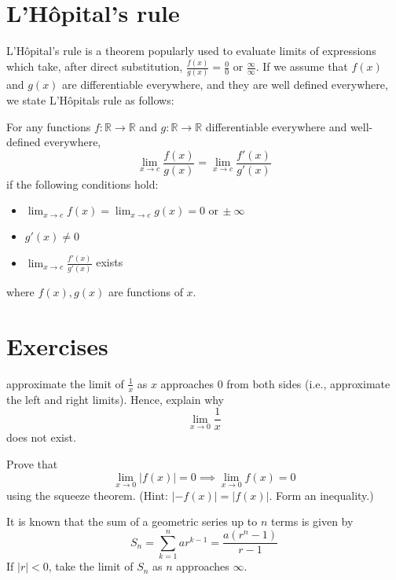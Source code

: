 \section{L'H\^{o}pital's rule}
L'H\^{o}pital's rule is a theorem popularly used to evaluate limits of expressions which take,
after direct substitution, $\frac{f(x)}{g(x)} = \frac{0}{0}$ or $\frac{\infty}{\infty}$.
If we assume that $f(x)$ and $g(x)$ are differentiable everywhere, and they are well defined
everywhere, we state L'H\^{o}pitals rule as follows:

\begin{theorem}
    For any functions $f : \mathbb{R} \to \mathbb{R}$ and $g : \mathbb{R} \to \mathbb{R}$ differentiable everywhere and well-defined
    everywhere,
    \[\lim_{x \to c} \frac{f(x)}{g(x)} = \lim_{x \to c} \frac{f'(x)}{g'(x)}\]
    if the following conditions hold:
    \begin{itemize}
        \item $\lim_{x \to c} f(x) = \lim_{x \to c} g(x) = 0 \,\,\text{or}\,\pm \infty$
        \item $g'(x) \ne 0$
        \item $\lim_{x \to c} \frac{f'(x)}{g'(x)}$ exists
    \end{itemize}
    where $f(x),g(x)$ are functions of $x$.
\end{theorem}

\newpage
\section{Exercises}

\begin{exercise}
    approximate the limit of $\frac{1}{x}$ as $x$ approaches $0$ from both sides
    (i.e., approximate the left and right limits). Hence, explain why
    \[\lim_{x \to 0} \frac{1}{x}\]
    does not exist.
\end{exercise}

\begin{exercise}
    Prove that \[\lim_{x \to 0} |f(x)| = 0 \implies \lim_{x \to 0} f(x) = 0\]
    using the squeeze theorem. (Hint: $|-f(x)| = |f(x)|$. Form an inequality.)
\end{exercise}

\begin{exercise}
    It is known that the sum of a geometric series up to $n$ terms is given by
    \[S_n = \sum_{k=1}^n ar^{k - 1} = \frac{a(r^n - 1)}{r - 1}\]
    If $|r| < 0$, take the limit of $S_n$ as $n$ approaches $\infty$.
\end{exercise}